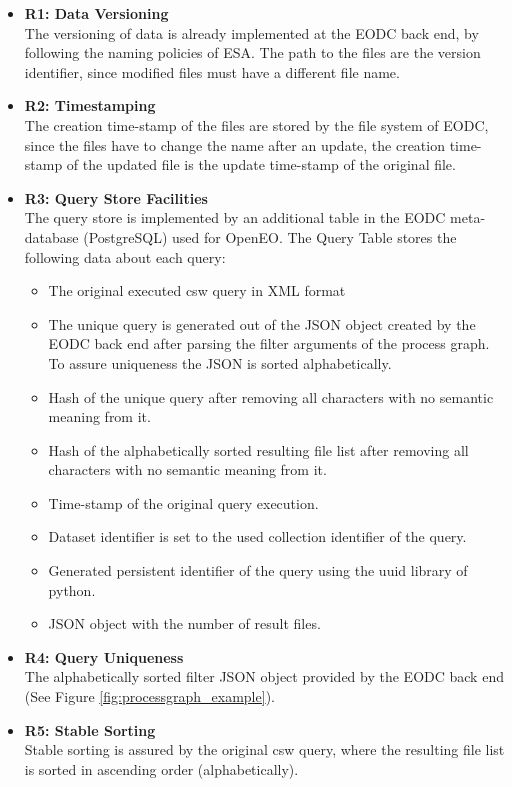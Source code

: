 \documentclass[draft,final]{vutinfth} %
\begin{document}
\begin{itemize}
	\item \textbf{R1: Data Versioning} \\
	The versioning of data is already implemented at the EODC back end, by following the naming policies of ESA. The path to the files are the version identifier, since modified files must have a different file name.
	\item \textbf{R2: Timestamping} \\
	The creation time-stamp of the files are stored by the file system of EODC, since the files have to change the name after an update, the creation time-stamp of the updated file is the update time-stamp of the original file. 
	\item \textbf{R3: Query Store Facilities} \\
	The query store is implemented by an additional table in the EODC meta-database (PostgreSQL) used for OpenEO. The Query Table stores the following data about each query:
	\begin{itemize}
		\item The original executed \acrshort{csw} query in XML format
		\item The unique query is generated out of the JSON object created by the EODC back end after parsing the filter arguments of the process graph. To assure uniqueness the JSON is sorted alphabetically.
		\item Hash of the unique query after removing all characters with no semantic meaning from it.
		\item Hash of the alphabetically sorted resulting file list after removing all characters with no semantic meaning from it. 
		\item Time-stamp of the original query execution.
		\item Dataset identifier is set to the used collection identifier of the query.
		\item Generated persistent identifier of the query using the uuid library of python.
		\item JSON object with the number of result files.
	\end{itemize}
	\item \textbf{R4: Query Uniqueness} \\
	The alphabetically sorted filter JSON object provided by the EODC back end (See Figure \ref{fig:processgraph_example}).
	\item \textbf{R5: Stable Sorting} \\
	Stable sorting is assured by the original \acrshort{csw} query, where the resulting file list is sorted in ascending order (alphabetically).

\end{itemize}
\end{document}
